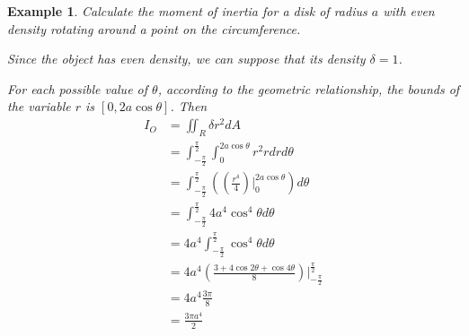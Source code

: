 \documentclass{article}
\newtheorem{example}{Example}
\begin{document}
\begin{example}
  Calculate the moment of inertia for a disk of radius $a$ with even density 
  rotating around a point on the circumference.


  Since the object has even density, we can suppose that its density 
  $\delta = 1$.

  For each possible value of $\theta$, according to the geometric relationship, 
  the bounds of the variable $r$ is $[0, 2a\cos\theta]$. Then
  \begin{equation*}
    \begin{split}
      I_O &= \iint_R \delta r^2 dA \\
          &= \int_{-\frac{\pi}{2}}^{\frac{\pi}{2}} \int_0^{2a\cos\theta} r^2 r dr d\theta \\
          &= \int_{-\frac{\pi}{2}}^{\frac{\pi}{2}} ((\frac{r^4}{4})|_0^{2a\cos\theta}) d\theta \\
          &= \int_{-\frac{\pi}{2}}^{\frac{\pi}{2}} 4a^4\cos^4\theta d\theta \\
          &= 4a^4 \int_{-\frac{\pi}{2}}^{\frac{\pi}{2}} \cos^4\theta d\theta \\
          &= 4a^4 (\frac{3 + 4\cos 2\theta + \cos 4\theta}{8})|_{-\frac{\pi}{2}}^{\frac{\pi}{2}} \\
          &= 4a^4 \frac{3\pi}{8} \\
          &= \frac{3\pi a^4}{2} \\
    \end{split}
  \end{equation*}


\end{example}
\end{document}
